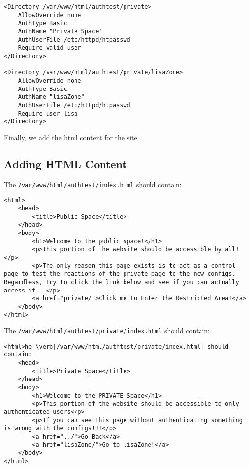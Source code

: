 \vspace{-15pt}
\begin{verbatim}
<Directory /var/www/html/authtest/private>
	AllowOverride none
	AuthType Basic
	AuthName "Private Space"
	AuthUserFile /etc/httpd/htpasswd        
	Require valid-user
</Directory>

<Directory /var/www/html/authtest/private/lisaZone>
	AllowOverride none
	AuthType Basic
	AuthName "lisaZone"
	AuthUserFile /etc/httpd/htpasswd        
	Require user lisa
</Directory>
\end{verbatim}
\vspace{-10pt}	

\noindent
Finally, we add the html content for the site.

\subsection{Adding HTML Content}
The \verb|/var/www/html/authtest/index.html| should contain:

\vspace{-15pt}
\begin{verbatim}
<html>
	<head>
		<title>Public Space</title>
	</head>
	<body>
		<h1>Welcome to the public space!</h1>
		<p>This portion of the website should be accessible by all!</p>
		<p>The only reason this page exists is to act as a control page to test the reactions of the private page to the new configs. Regardless, try to click the link below and see if you can actually access it...</p>
		<a href="private/">Click me to Enter the Restricted Area!</a>
	</body>
</html>
\end{verbatim}
\vspace{-10pt}	

\noindent
The \verb|/var/www/html/authtest/private/index.html| should contain:

\vspace{-15pt}
\begin{verbatim}
<html>he \verb|/var/www/html/authtest/private/index.html| should contain:
	<head>
		<title>Private Space</title>
	</head>
	<body>
		<h1>Welcome to the PRIVATE Space</h1>
		<p>This portion of the website should be accessible to only authenticated users</p>
		<p>If you can see this page without authenticating something is wrong with the configs!!!</p>
		<a href="../">Go Back</a>
		<a href="lisaZone/">Go to lisaZone!</a>
	</body>
</html>
\end{verbatim}
\vspace{-10pt}	

